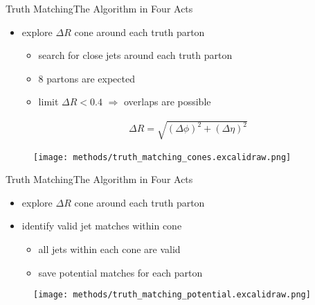 \documentclass[9pt, aspectratio=169]{beamer}
\begin{document}
\begin{frame}{Truth Matching}{The Algorithm in Four Acts}
	\begin{minipage}{.60\textwidth}
		\begin{itemize}
			\item explore $\Delta R$ cone around each truth parton
			\begin{itemize}
				\item search for close \colorbox{red!40}{jets} around each \colorbox{highlighter!40}{truth} parton
				\item 8 partons are expected
				\item limit $\Delta R<0.4$ $\Rightarrow$ overlaps are possible
			\end{itemize}

			\begin{align*}
				\Delta R = \sqrt{\left(\Delta \phi\right)^2 + \left(\Delta \eta\right)^2}
			\end{align*}
		\end{itemize}
	\end{minipage}\hfill
	\begin{minipage}{.38\textwidth}
		\begin{figure}
			\centering
			\texttt{[image: methods/truth\_matching\_cones.excalidraw.png]}
		\end{figure}
	\end{minipage}
\end{frame}

\addtocounter{framenumber}{-1} 

\begin{frame}{Truth Matching}{The Algorithm in Four Acts}
	\begin{minipage}{.60\textwidth}
		\begin{itemize}
			\item explore $\Delta R$ cone around each truth parton 
			\item identify valid jet matches within cone
			\begin{itemize}
				\item all jets within each cone are valid
				\item save potential matches for each parton
			\end{itemize}
		\end{itemize}
	\end{minipage}\hfill
	\begin{minipage}{.38\textwidth}
		\begin{figure}
			\centering
			\texttt{[image: methods/truth\_matching\_potential.excalidraw.png]}
		\end{figure}
	\end{minipage}
\end{frame}
\end{document}
